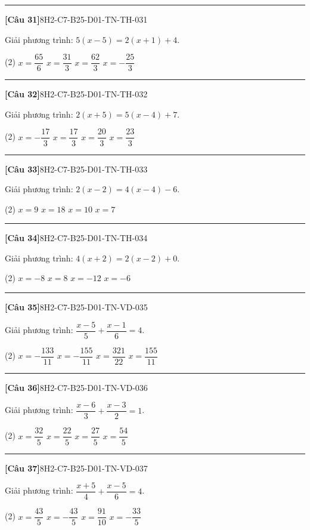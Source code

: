 \documentclass[12pt,a4paper]{article}
\newif\ifloigiai
\newenvironment{cauhoi}[2]{%
  \par\medskip\noindent\rule{\textwidth}{0.4pt}\par\nopagebreak
  \noindent\textbf{[#1]}\hfill{\scriptsize\ttfamily #2}\par\nopagebreak\smallskip}{\par}
\newcommand{\dapan}[1]{\ifloigiai\par\smallskip\noindent\textit{Đáp án:} \textbf{#1}\par\fi}
\begin{document}
\begin{cauhoi}{Câu 31}{8H2-C7-B25-D01-TN-TH-031}
Giải phương trình: $5(x - 5)=2(x + 1)+4$.
\begin{tasks}(2)
\task $x=\dfrac{65}{6}$
\task $x=\dfrac{31}{3}$
\task $x=\dfrac{62}{3}$
\task $x=-\dfrac{25}{3}$
\end{tasks}
\dapan{B}
\end{cauhoi}
\begin{cauhoi}{Câu 32}{8H2-C7-B25-D01-TN-TH-032}
Giải phương trình: $2(x + 5)=5(x - 4)+7$.
\begin{tasks}(2)
\task $x=-\dfrac{17}{3}$
\task $x=\dfrac{17}{3}$
\task $x=\dfrac{20}{3}$
\task $x=\dfrac{23}{3}$
\end{tasks}
\dapan{D}
\end{cauhoi}
\begin{cauhoi}{Câu 33}{8H2-C7-B25-D01-TN-TH-033}
Giải phương trình: $2(x - 2)=4(x - 4)-6$.
\begin{tasks}(2)
\task $x=9$
\task $x=18$
\task $x=10$
\task $x=7$
\end{tasks}
\dapan{A}
\end{cauhoi}
\begin{cauhoi}{Câu 34}{8H2-C7-B25-D01-TN-TH-034}
Giải phương trình: $4(x + 2)=2(x - 2)+0$.
\begin{tasks}(2)
\task $x=-8$
\task $x=8$
\task $x=-12$
\task $x=-6$
\end{tasks}
\dapan{D}
\end{cauhoi}
\begin{cauhoi}{Câu 35}{8H2-C7-B25-D01-TN-VD-035}
Giải phương trình: $\dfrac{x - 5}{5}+\dfrac{x - 1}{6}=4$.
\begin{tasks}(2)
\task $x=-\dfrac{133}{11}$
\task $x=-\dfrac{155}{11}$
\task $x=\dfrac{321}{22}$
\task $x=\dfrac{155}{11}$
\end{tasks}
\dapan{D}
\end{cauhoi}
\begin{cauhoi}{Câu 36}{8H2-C7-B25-D01-TN-VD-036}
Giải phương trình: $\dfrac{x - 6}{3}+\dfrac{x - 3}{2}=1$.
\begin{tasks}(2)
\task $x=\dfrac{32}{5}$
\task $x=\dfrac{22}{5}$
\task $x=\dfrac{27}{5}$
\task $x=\dfrac{54}{5}$
\end{tasks}
\dapan{C}
\end{cauhoi}
\begin{cauhoi}{Câu 37}{8H2-C7-B25-D01-TN-VD-037}
Giải phương trình: $\dfrac{x + 5}{4}+\dfrac{x - 5}{6}=4$.
\begin{tasks}(2)
\task $x=\dfrac{43}{5}$
\task $x=-\dfrac{43}{5}$
\task $x=\dfrac{91}{10}$
\task $x=-\dfrac{33}{5}$
\end{tasks}
\dapan{A}
\end{cauhoi}
\end{document}
